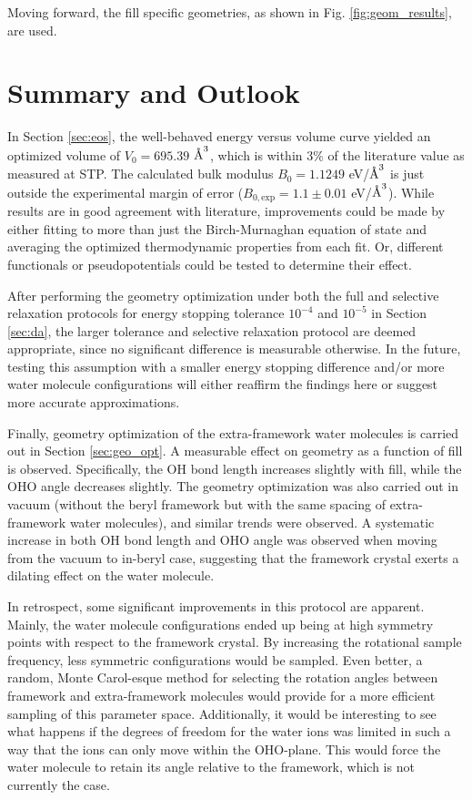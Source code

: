         Moving forward, the fill specific geometries, as shown in Fig. \ref{fig:geom_results}, are used. 
        
    \section{Summary and Outlook}
    
    In Section \ref{sec:eos}, the well-behaved energy versus volume curve yielded an optimized volume of $V_0 = 695.39$ $\text{\normalfont\AA}^3$, which is within 3\% of the literature value as measured at STP. The calculated bulk modulus $B_0 = 1.1249$ eV/$\text{\normalfont\AA}^3$ is just outside the experimental margin of error ($B_{0,\text{exp}} = 1.1 \pm 0.01$ eV/$\text{\normalfont\AA}^3$). While results are in good agreement with literature, improvements could be made by either fitting to more than just the Birch-Murnaghan equation of state and averaging the optimized thermodynamic properties from each fit. Or, different functionals or pseudopotentials could be tested to determine their effect. 
    
    After performing the geometry optimization under both the full and selective relaxation protocols for energy stopping tolerance $10^{-4}$ and $10^{-5}$ in Section \ref{sec:da}, the larger tolerance and selective relaxation protocol are deemed appropriate, since no significant difference is measurable otherwise. In the future, testing this assumption with a smaller energy stopping difference and/or more water molecule configurations will either reaffirm the findings here or suggest more accurate approximations.
    
    Finally, geometry optimization of the extra-framework water molecules is carried out in Section \ref{sec:geo_opt}. A measurable effect on geometry as a function of fill is observed. Specifically, the OH bond length increases slightly with fill, while the OHO angle decreases slightly. The geometry optimization was also carried out in vacuum (without the beryl framework but with the same spacing of extra-framework water molecules), and similar trends were observed. A systematic increase in both OH bond length and OHO angle was observed when moving from the vacuum to in-beryl case, suggesting that the framework crystal exerts a dilating effect on the water molecule.
    
    In retrospect, some significant improvements in this protocol are apparent. Mainly, the water molecule configurations ended up being at high symmetry points with respect to the framework crystal. By increasing the rotational sample frequency, less symmetric configurations would be sampled. Even better, a random, Monte Carol-esque method for selecting the rotation angles between framework and extra-framework molecules would provide for a more efficient sampling of this parameter space. Additionally, it would be interesting to see what happens if the degrees of freedom for the water ions was limited in such a way that the ions can only move within the OHO-plane. This would force the water molecule to retain its angle relative to the framework, which is not currently the case.
        
